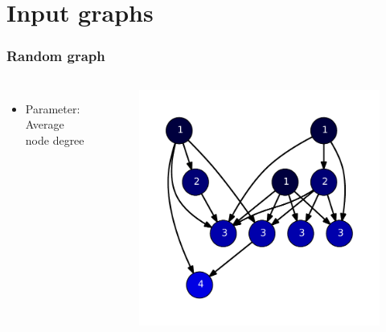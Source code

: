 \section{Input graphs}
\begin{frame}
\frametitle{Random graph}

\begin{columns}[c]
 \begin{itemize}
  \item Parameter: Average node degree
 \end{itemize}

 \begin{figure}[!hbp]
    \includegraphics[height=0.7\textheight]{img/random_lin10.pdf}
 \end{figure}
\end{columns}

\end{frame}

